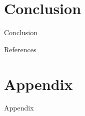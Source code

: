 \documentclass[10pt]{beamer}
\begin{document}


\section{Conclusion}
\begin{frame}{Conclusion}
\end{frame}

\begin{frame}{References} 
    \nocite{*}
    
    
\end{frame}

\section{Appendix}
\begin{frame}{Appendix}
\end{frame}
\end{document}
